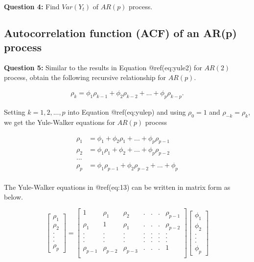 \documentclass[
  11pt,
  a4paper,
]{report}
\begin{document}
\textbf{Question 4: } Find \(Var(Y_t)\) of \(AR(p)\) process.

\subsection{Autocorrelation function (ACF) of an AR(p)
process}\label{autocorrelation-function-acf-of-an-arp-process}

\textbf{Question 5: } Similar to the results in Equation @ref(eq:yule2)
for \(AR(2)\) process, obtain the following recursive relationship for
\(AR(p)\).

\begin{align}
\rho_k = \phi_1\rho_{k-1}+\phi_2 \rho_{k-2} + ... + \phi_p \rho_{k-p}.
\end{align}

Setting \(k=1, 2, ..., p\) into Equation @ref(eq:yulep) and using
\(\rho_0=1\) and \(\rho_{-k}=\rho_k\), we get the Yule-Walker equations
for \(AR(p)\) process

\begin{equation}
\begin{aligned}
  \rho_1 &= \phi_1+\phi_2 \rho_{1} + ... + \phi_p \rho_{p-1}\\
  \rho_2 &= \phi_1 \rho_1+\phi_2  + ... + \phi_p \rho_{p-2}\\
  ... \\
  \rho_p &= \phi_1 \rho_{p-1} +\phi_2 \rho_{p-2}  + ... + \phi_p \\
\end{aligned}
\end{equation}

The Yule-Walker equations in @ref(eq:13) can be written in matrix form
as below.

\[\left[\begin{array}
{r}
\rho_1  \\
\rho_2  \\
.\\
.\\
.\\
\rho_p
\end{array}\right] = \left[\begin{array}
{rrrrrrr}
1 & \rho_1 & \rho_2 & .&.&.& \rho_{p-1} \\
\rho_1 & 1 & \rho_1 & .&.&.& \rho_{p-2} \\
. & . & . & .&.&.& . \\
. & . & . & .&.&.& . \\
. & . & . & .&.&.& . \\
\rho_{p-1} & \rho_{p-2} & \rho_{p-3} & .&.&.& 1 \\
\end{array}\right] \left[\begin{array}
{r}
\phi_1  \\
\phi_2  \\
.\\
.\\
.\\
\phi_p
\end{array}\right]
\]
\end{document}
